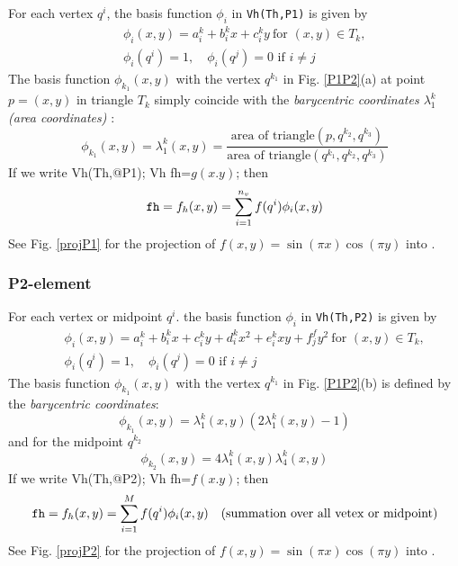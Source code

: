 \documentclass[a4paper,twoside,12pt]{book}
\begin{document}
For each vertex $q^i$, the basis function $\phi_i$ in \texttt{Vh(Th,P1)}
is given by
\begin{eqnarray*}
&&\phi_i(x,y)=a^k_i+b^k_ix+c^k_iy~\textrm{for }(x,y)\in T_k,\\
&&\phi_i(q^i)=1,\quad \phi_i(q^j)=0\textrm{ if }i\neq j
\end{eqnarray*}
The basis function $\phi_{k_1}(x,y)$ with the vertex $q^{k_1}$ in
Fig. \ref{P1P2}(a) at point $p=(x,y)$ in triangle $T_k$ simply coincide with the
\emph{barycentric coordinates $\lambda^k_1$ (area coordinates)} :
$$
\phi_{k_1}(x,y) = \lambda^k_{1}(x,y)=
\frac{\textrm{area of triangle} (p, q^{k_2},q^{k_3})}
{\textrm{area of triangle}(q^{k_1},q^{k_2},q^{k_3})}
$$
If we write
\bFF
Vh(Th,@P1); Vh fh=$g(x.y)$;
\eFF
then
$$
\ttCC{fh}=f_h(x,y)=\sum_{i=1}^{n_v}f(q^i)\phi_i(x,y)
$$
See Fig. \ref{projP1} for the projection of $f(x,y)=\sin(\pi x)\cos(\pi y)$
into .


\subsubsection{P2-element}
For each vertex or midpoint $q^i$. the basis function $\phi_i$ in \texttt{Vh(Th,P2)}
is given by
\begin{eqnarray*}
&&\phi_i(x,y)=a^k_i+b^k_ix+c^k_iy+d^k_ix^2+e^k_ixy+f^f_jy^2~\textrm{for }(x,y)\in T_k,\\
&&\phi_i(q^i)=1,\quad \phi_i(q^j)=0\textrm{ if }i\neq j
\end{eqnarray*}
The basis function $\phi_{k_1}(x,y)$ with the vertex $q^{k_1}$ in
Fig. \ref{P1P2}(b) is defined by the \emph{barycentric coordinates}:
$$
\phi_{k_1}(x,y) = \lambda^k_{1}(x,y)(2\lambda^k_1(x,y)-1)
$$
and for the midpoint $q^{k_2}$
$$
\phi_{k_2}(x,y) = 4\lambda^k_1(x,y)\lambda^k_4(x,y)
$$
If we write
\bFF
Vh(Th,@P2); Vh fh=$f(x.y)$;
\eFF
then
$$
\ttCC{fh}=f_h(x,y)=\sum_{i=1}^{M}f(q^i)\phi_i(x,y)\quad (\textrm{summation over all vetex or midpoint})
$$
See Fig. \ref{projP2} for the projection of $f(x,y)=\sin(\pi x)\cos(\pi y)$
into .

\end{document}
